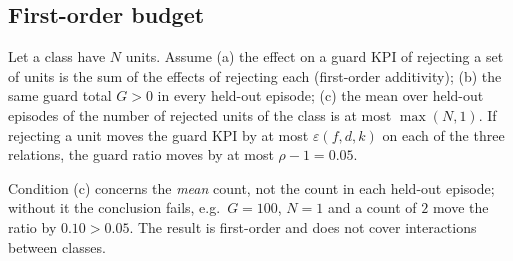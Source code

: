 \subsection{First-order budget}
\label{spec:gate.budget}

\begin{theorem}
Let a class have $N$ units. Assume (a) the effect on a guard KPI of rejecting a set of units is the sum of the effects of rejecting each (first-order additivity); (b) the same guard total $G > 0$ in every held-out episode; (c) the mean over held-out episodes of the number of rejected units of the class is at most $\max(N, 1)$. If rejecting a unit moves the guard KPI by at most $\varepsilon(f,d,k)$ on each of the three relations, the guard ratio moves by at most $\rho - 1 = 0.05$.
\end{theorem}

\noindent Condition (c) concerns the \emph{mean} count, not the count in each held-out episode; without it the conclusion fails, e.g.\ $G = 100$, $N = 1$ and a count of $2$ move the ratio by $0.10 > 0.05$. The result is first-order and does not cover interactions between classes.

